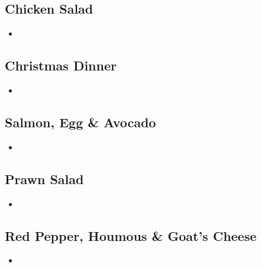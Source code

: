 \documentclass[11pt, english]{article}
\begin{document}
\newpage

	\subsection{Chicken Salad}

	\begin{itemize}
	\setlength\itemsep{0cm}
		\item 
	\end{itemize}

\newpage

	\subsection{Christmas Dinner}

	\begin{itemize}
	\setlength\itemsep{0cm}
		\item 
	\end{itemize}

\newpage
	
	\subsection{Salmon, Egg \& Avocado}

	\begin{itemize}
	\setlength\itemsep{0cm}
		\item 
	\end{itemize}

\newpage

	\subsection{Prawn Salad}

	\begin{itemize}
	\setlength\itemsep{0cm}
		\item 
	\end{itemize}

\newpage

	\subsection{Red Pepper, Houmous \& Goat's Cheese}

	\begin{itemize}
	\setlength\itemsep{0cm}
		\item 
	\end{itemize}

\newpage
\end{document}
